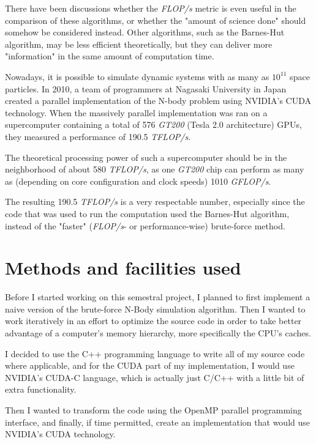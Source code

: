 \documentclass[journal]{IEEEtran}
\begin{document}
		There have been discussions whether the \textit{FLOP/s} metric is even useful in the comparison of these algorithms, or whether the "amount of science done" should somehow be considered instead. Other algorithms, such as the Barnes-Hut algorithm, may be less efficient theoretically, but they can deliver more "information" in the same amount of computation time.
		
		Nowadays, it is possible to simulate dynamic systems with as many as $10^{11}$ space particles. In 2010, a team of programmers at Nagasaki University in Japan created a parallel implementation of the N-body problem using NVIDIA’s CUDA technology. When the massively parallel implementation was ran on a supercomputer containing a total of 576 \textit{GT200} (Tesla 2.0 architecture) GPUs, they measured a performance of 190.5 \textit{TFLOP/s}. \cite{teraflops}
		
		The theoretical processing power of such a supercomputer should be in the neighborhood of about 580 \textit{TFLOP/s}, as one \textit{GT200} chip can perform as many as (depending on core configuration and clock speeds) 1010 \textit{GFLOP/s}.\cite{wikitesla}
		
		The resulting 190.5 \textit{TFLOP/s} is a very respectable number, especially since the code that was used to run the computation used the Barnes-Hut algorithm, instead of the "faster" (\textit{FLOP/s}- or performance-wise) brute-force method.
		
	\section{Methods and facilities used}
	
	
		Before I started working on this semestral project, I planned to first implement a naive version of the brute-force N-Body simulation algorithm. Then I wanted to work iteratively in an effort to optimize the source code in order to take better advantage of a computer's memory hierarchy, more specifically the CPU's caches. 
		
		I decided to use the C++ programming language to write all of my source code where applicable, and for the CUDA part of my implementation, I would use NVIDIA's CUDA-C language, which is actually just C/C++ with a little bit of extra functionality.
		
		Then I wanted to transform the code using the OpenMP parallel programming interface, and finally, if time permitted, create an implementation that would use NVIDIA's CUDA technology.
		
\end{document}
